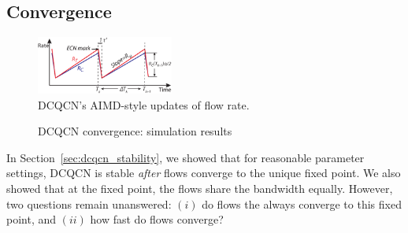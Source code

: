 \subsection{Convergence}
\label{sec:dcqcn_convergence}


\begin{figure}[t]
\center
\includegraphics[width=0.4\textwidth]{figures/dcqcn_convergence_brief.eps}
\caption{DCQCN's AIMD-style updates of flow rate.}
\label{fig:dcqcn_convergence}
\end{figure}

\begin{figure}[t]
\center
{}
\caption{DCQCN convergence: simulation results}
\label{fig:dcqcn_convergence_sim}
\end{figure}
In Section~\ref{sec:dcqcn_stability}, we showed that for reasonable parameter
settings,  DCQCN is stable {\em after} flows converge to the unique fixed point.
We also showed that at the fixed point, the flows share the bandwidth equally.
However, two questions remain unanswered: $(i)$ do flows the always converge
to this fixed point, and $(ii)$ how fast do flows converge? 

